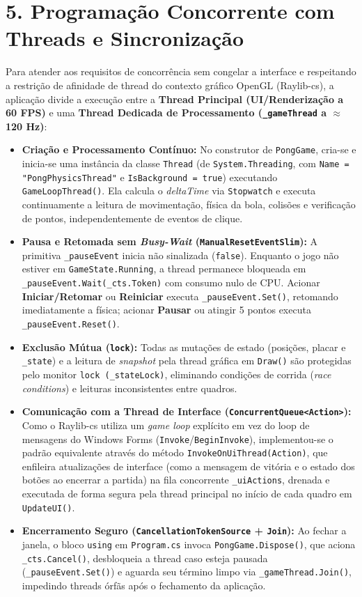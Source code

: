 \documentclass[10pt,a4paper]{article}
\begin{document}
\section*{5. Programação Concorrente com Threads e Sincronização}
Para atender aos requisitos de concorrência sem congelar a interface e respeitando a restrição de afinidade de thread do contexto gráfico OpenGL (Raylib-cs), a aplicação divide a execução entre a \textbf{Thread Principal (UI/Renderização a 60 FPS)} e uma \textbf{Thread Dedicada de Processamento (\texttt{\_gameThread} a $\approx$120 Hz)}:

\begin{itemize}
    \item \textbf{Criação e Processamento Contínuo:} No construtor de \texttt{PongGame}, cria-se e inicia-se uma instância da classe \texttt{Thread} (de \texttt{System.Threading}, com \texttt{Name = "PongPhysicsThread"} e \texttt{IsBackground = true}) executando \texttt{GameLoopThread()}. Ela calcula o \textit{deltaTime} via \texttt{Stopwatch} e executa continuamente a leitura de movimentação, física da bola, colisões e verificação de pontos, independentemente de eventos de clique.
    \item \textbf{Pausa e Retomada sem \textit{Busy-Wait} (\texttt{ManualResetEventSlim}):} A primitiva \texttt{\_pauseEvent} inicia não sinalizada (\texttt{false}). Enquanto o jogo não estiver em \texttt{GameState.Running}, a thread permanece bloqueada em \texttt{\_pauseEvent.Wait(\_cts.Token)} com consumo nulo de CPU. Acionar \textbf{Iniciar/Retomar} ou \textbf{Reiniciar} executa \texttt{\_pauseEvent.Set()}, retomando imediatamente a física; acionar \textbf{Pausar} ou atingir 5 pontos executa \texttt{\_pauseEvent.Reset()}.
    \item \textbf{Exclusão Mútua (\texttt{lock}):} Todas as mutações de estado (posições, placar e \texttt{\_state}) e a leitura de \textit{snapshot} pela thread gráfica em \texttt{Draw()} são protegidas pelo monitor \texttt{lock (\_stateLock)}, eliminando condições de corrida (\textit{race conditions}) e leituras inconsistentes entre quadros.
    \item \textbf{Comunicação com a Thread de Interface (\texttt{ConcurrentQueue<Action>}):} Como o Raylib-cs utiliza um \textit{game loop} explícito em vez do loop de mensagens do Windows Forms (\texttt{Invoke}/\texttt{BeginInvoke}), implementou-se o padrão equivalente através do método \texttt{InvokeOnUiThread(Action)}, que enfileira atualizações de interface (como a mensagem de vitória e o estado dos botões ao encerrar a partida) na fila concorrente \texttt{\_uiActions}, drenada e executada de forma segura pela thread principal no início de cada quadro em \texttt{UpdateUI()}.
    \item \textbf{Encerramento Seguro (\texttt{CancellationTokenSource} + \texttt{Join}):} Ao fechar a janela, o bloco \texttt{using} em \texttt{Program.cs} invoca \texttt{PongGame.Dispose()}, que aciona \texttt{\_cts.Cancel()}, desbloqueia a thread caso esteja pausada (\texttt{\_pauseEvent.Set()}) e aguarda seu término limpo via \texttt{\_gameThread.Join()}, impedindo threads órfãs após o fechamento da aplicação.
\end{itemize}
\end{document}
